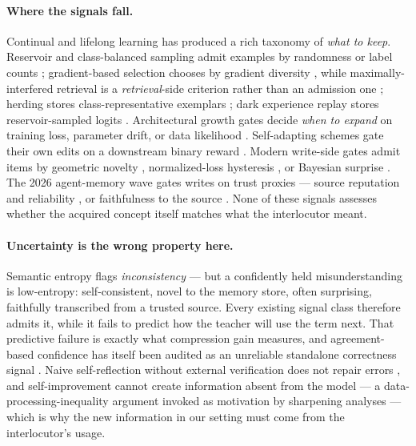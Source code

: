 \documentclass[11pt]{article}
\begin{document}
\paragraph{Where the signals fall.}
Continual and lifelong learning has produced a rich taxonomy of \emph{what to keep}.
Reservoir and class-balanced sampling admit examples by randomness or label counts
\citep{prabhu2020gdumb,chaudhry2019tiny}; gradient-based selection chooses by gradient
diversity \citep{aljundi2019gss}, while maximally-interfered retrieval is a
\emph{retrieval}-side criterion rather than an admission one \citep{aljundi2019mir};
herding stores class-representative exemplars \citep{rebuffi2017icarl}; dark experience
replay stores reservoir-sampled logits \citep{buzzega2020derpp}. Architectural growth gates
decide \emph{when to expand} on training loss, parameter drift, or data likelihood
\citep{yoon2017den,lee2020cndpm}. Self-adapting schemes gate their own edits on a downstream binary reward
\citep{zweiger2025seal}. Modern write-side gates admit items by geometric novelty
\citep{wang2026sage}, normalized-loss hysteresis \citep{li2025selfsizing}, or Bayesian
surprise \citep{gorlo2026worth}. The 2026 agent-memory wave gates writes on trust proxies
--- source reputation and reliability \citep{zahn2026writetime}, or faithfulness to the
source \citep{yang2026trustmem}. None of these signals assesses whether the acquired
concept itself matches what the interlocutor meant.

\paragraph{Uncertainty is the wrong property here.}
Semantic entropy flags \emph{inconsistency} \citep{farquhar2024semantic} --- but a
confidently held misunderstanding is low-entropy: self-consistent, novel to the memory
store, often surprising, faithfully transcribed from a trusted source. Every existing
signal class therefore admits it, while it fails to predict how the teacher will use the
term next. That predictive failure is exactly what compression gain measures, and agreement-based
confidence has itself been audited as an unreliable standalone correctness signal
\citep{ding2026agree}. Naive
self-reflection without external verification does not repair errors
\citep{huang2024cannot}, and self-improvement cannot create information absent from the
model --- a data-processing-inequality argument \citep{cover1999elements} invoked as
motivation by sharpening analyses \citep{huang2024sharpening} --- which is why the new
information in our setting must come from the interlocutor's usage.
\end{document}
